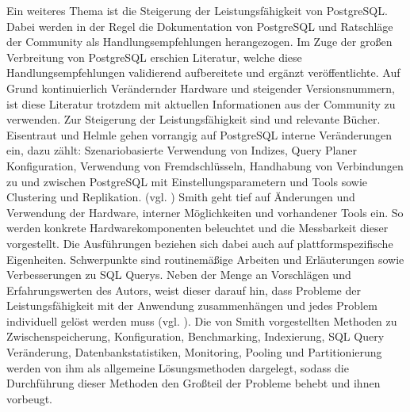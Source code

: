 Ein weiteres Thema ist die Steigerung der Leistungsfähigkeit von PostgreSQL.
Dabei werden in der Regel die Dokumentation von PostgreSQL und Ratschläge der Community als Handlungsempfehlungen herangezogen.
Im Zuge der großen Verbreitung von PostgreSQL erschien Literatur, welche diese Handlungsempfehlungen validierend aufbereitete und ergänzt veröffentlichte.
Auf Grund kontinuierlich Verändernder Hardware und steigender Versionsnummern, ist diese Literatur trotzdem mit aktuellen Informationen aus der Community zu verwenden.
Zur Steigerung der Leistungsfähigkeit sind \cite{book:postgresqladmin} und \cite{book:postgresqlperformance} relevante Bücher.
%
Eisentraut und Helmle gehen vorrangig auf PostgreSQL interne Veränderungen ein, dazu zählt:
Szenariobasierte Verwendung von Indizes, Query Planer Konfiguration, Verwendung von Fremdschlüsseln, Handhabung von Verbindungen zu und zwischen PostgreSQL mit Einstellungsparametern und Tools sowie Clustering und Replikation. (vgl. \cite[S.206 ff.]{book:postgresqladmin})
%
Smith geht tief auf Änderungen und Verwendung der Hardware, interner Möglichkeiten und vorhandener Tools ein.
So werden konkrete Hardwarekomponenten beleuchtet und die Messbarkeit dieser vorgestellt.
Die Ausführungen beziehen sich dabei auch auf plattformspezifische Eigenheiten.
Schwerpunkte sind routinemäßige Arbeiten und Erläuterungen sowie Verbesserungen zu SQL Querys.
Neben der Menge an Vorschlägen und Erfahrungswerten des Autors, weist dieser darauf hin, dass Probleme der Leistungsfähigkeit mit der Anwendung zusammenhängen und jedes Problem individuell gelöst werden muss (vgl. \cite[S.18]{book:postgresqlperformance}).
Die von Smith vorgestellten Methoden zu Zwischenspeicherung, Konfiguration, Benchmarking, Indexierung, SQL Query Veränderung, Datenbankstatistiken, Monitoring, Pooling und Partitionierung werden von ihm als allgemeine Lösungsmethoden dargelegt, sodass die Durchführung dieser Methoden den Großteil der Probleme behebt und ihnen vorbeugt.



